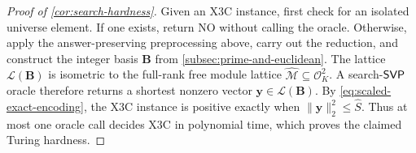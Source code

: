 \begin{proof}[Proof of \cref{cor:search-hardness}]
Given an X3C instance, first check for an isolated universe
element.  If one exists, return NO without calling the oracle.  Otherwise,
apply the answer-preserving preprocessing above, carry out the reduction, and
construct the integer basis $\mathbf B$ from
\cref{subsec:prime-and-euclidean}.  The lattice
$\mathcal L(\mathbf B)$ is isometric to the full-rank free module lattice
$\widehat{\mathcal M}\subseteq\mathcal{O}_K^2$.  A search-$\mathsf{SVP}$ oracle
therefore returns a shortest nonzero vector
$\mathbf y\in\mathcal L(\mathbf B)$.
By \cref{eq:scaled-exact-encoding}, the X3C
instance is positive exactly when $\|\mathbf y\|_2^2\le\widehat S$.
Thus at most one oracle call decides X3C in polynomial time,
which proves the claimed Turing hardness.
\end{proof}
